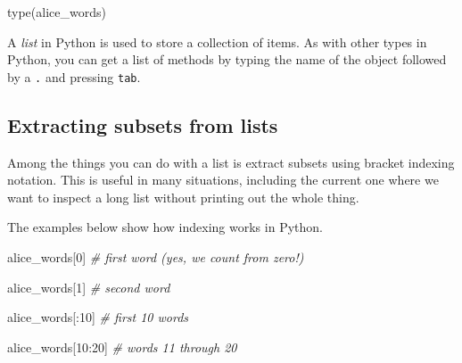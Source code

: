\documentclass[]{book}
\newenvironment{Shaded}{\begin{snugshade}}{\end{snugshade}}
\newcommand{\DecValTok}[1]{\textcolor[rgb]{0.00,0.00,0.81}{#1}}
\newcommand{\CommentTok}[1]{\textcolor[rgb]{0.56,0.35,0.01}{\textit{#1}}}
\newcommand{\BuiltInTok}[1]{#1}
\newcommand{\NormalTok}[1]{#1}
\begin{document}
\begin{Shaded}
\begin{Highlighting}[]
\BuiltInTok{type}\NormalTok{(alice_words)}
\end{Highlighting}
\end{Shaded}

A \emph{list} in Python is used to store a collection of items. As with
other types in Python, you can get a list of methods by typing the name
of the object followed by a \texttt{.} and pressing \texttt{tab}.

\subsection{Extracting subsets from
lists}\label{extracting-subsets-from-lists}

Among the things you can do with a list is extract subsets using bracket
indexing notation. This is useful in many situations, including the
current one where we want to inspect a long list without printing out
the whole thing.

The examples below show how indexing works in Python.

\begin{Shaded}
\begin{Highlighting}[]
\NormalTok{alice_words[}\DecValTok{0}\NormalTok{] }\CommentTok{# first word (yes, we count from zero!)}
\end{Highlighting}
\end{Shaded}

\begin{Shaded}
\begin{Highlighting}[]
\NormalTok{alice_words[}\DecValTok{1}\NormalTok{] }\CommentTok{# second word}
\end{Highlighting}
\end{Shaded}

\begin{Shaded}
\begin{Highlighting}[]
\NormalTok{alice_words[:}\DecValTok{10}\NormalTok{] }\CommentTok{# first 10 words}
\end{Highlighting}
\end{Shaded}

\begin{Shaded}
\begin{Highlighting}[]
\NormalTok{alice_words[}\DecValTok{10}\NormalTok{:}\DecValTok{20}\NormalTok{] }\CommentTok{# words 11 through 20}
\end{Highlighting}
\end{Shaded}
\end{document}
